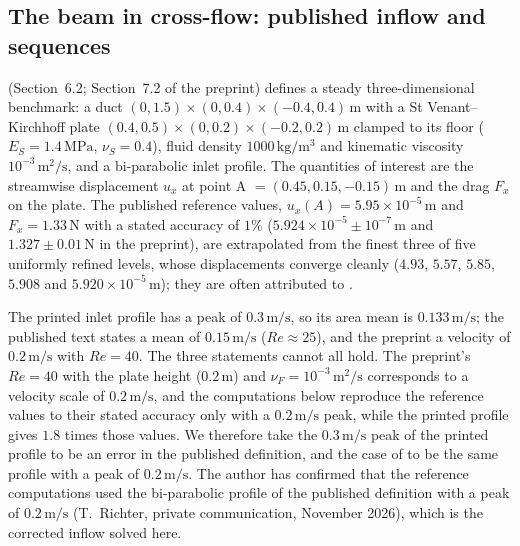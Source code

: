 \documentclass[sn-mathphys,Numbered]{sn-jnl}%
\renewcommand\paragraph[1]{\par\addvspace{1.2ex plus .4ex minus .2ex}%
	\noindent{\normalfont\bfseries #1}\hspace{0.5em}\ignorespaces}
\begin{document}
\begin{appendices}

\section{The beam in cross-flow: published inflow and sequences}
\label{app:beam}
\citet{Richter2012} (Section~6.2; Section~7.2 of the preprint) defines a steady three-dimensional benchmark: a duct $(0,1.5)\times(0,0.4)\times(-0.4,0.4)\,\mathrm{m}$ with a St Venant--Kirchhoff plate $(0.4,0.5)\times(0,0.2)\times(-0.2,0.2)\,\mathrm{m}$ clamped to its floor ($E_S = 1.4\,\mathrm{MPa}$, $\nu_S = 0.4$), fluid density $1000\,\mathrm{kg/m^3}$ and kinematic viscosity $10^{-3}\,\mathrm{m^2/s}$, and a bi-parabolic inlet profile. The quantities of interest are the streamwise displacement $u_x$ at point A $= (0.45, 0.15, -0.15)\,\mathrm{m}$ and the drag $F_x$ on the plate. The published reference values, $u_x(A) = 5.95\times10^{-5}\,\mathrm{m}$ and $F_x = 1.33\,\mathrm{N}$ with a stated accuracy of $1\%$ ($5.924\times10^{-5}\pm10^{-7}\,\mathrm{m}$ and $1.327\pm0.01\,\mathrm{N}$ in the preprint), are extrapolated from the finest three of five uniformly refined levels, whose displacements converge cleanly ($4.93$, $5.57$, $5.85$, $5.908$ and $5.920\times10^{-5}\,\mathrm{m}$); they are often attributed to \citet{Richter2015} \citep[e.g.][]{Aulisa2018}.

\paragraph{An error in the published inflow.}
The printed inlet profile has a peak of $0.3\,\mathrm{m/s}$, so its area mean is $0.133\,\mathrm{m/s}$; the published text states a mean of $0.15\,\mathrm{m/s}$ ($Re \approx 25$), and the preprint a velocity of $0.2\,\mathrm{m/s}$ with $Re = 40$. The three statements cannot all hold. The preprint's $Re = 40$ with the plate height ($0.2\,\mathrm{m}$) and $\nu_F = 10^{-3}\,\mathrm{m^2/s}$ corresponds to a velocity scale of $0.2\,\mathrm{m/s}$, and the computations below reproduce the reference values to their stated accuracy only with a $0.2\,\mathrm{m/s}$ peak, while the printed profile gives $1.8$ times those values. We therefore take the $0.3\,\mathrm{m/s}$ peak of the printed profile to be an error in the published definition, and the case of \citet{Richter2012} to be the same profile with a peak of $0.2\,\mathrm{m/s}$. The author has confirmed that the reference computations used the bi-parabolic profile of the published definition with a peak of $0.2\,\mathrm{m/s}$ (T.~Richter, private communication, November 2026), which is the corrected inflow solved here.


\end{appendices}
\end{document}
